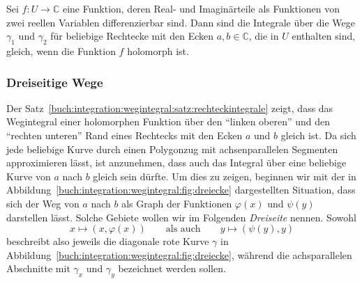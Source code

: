 \begin{satz}
\label{buch:integration:wegintegral:satz:rechteckintegrale}
Sei $f\colon U\to\mathbb{C}$ 
eine Funktion, deren Real- und Imaginärteile als Funktionen von zwei
reellen Variablen differenzierbar sind. 
Dann sind die Integrale über die Wege $\gamma_1$ und $\gamma_2$ für
beliebige Rechtecke mit den Ecken $a,b\in\mathbb{C}$, die in $U$
enthalten sind, gleich, wenn die Funktion $f$ holomorph ist.
\end{satz}

%
%
\subsubsection{Dreiseitige Wege}

Der Satz~\ref{buch:integration:wegintegral:satz:rechteckintegrale}
zeigt, dass das Wegintegral einer holomorphen Funktion über den
``linken oberen'' und den ``rechten unteren'' Rand eines Rechtecks 
mit den Ecken $a$ und $b$ gleich ist.
Da sich jede beliebige Kurve durch einen Polygonzug mit achsenparallelen
Segmenten approximieren lässt, ist anzunehmen, dass auch das Integral
über eine beliebige Kurve von $a$ nach $b$ gleich sein dürfte.
Um dies zu zeigen, beginnen wir mit der in
Abbildung~\ref{buch:integration:wegintegral:fig:dreiecke}
dargestellten Situation, dass sich der Weg von $a$ nach $b$ als Graph
der Funktionen $\varphi(x)$ und $\psi(y)$ darstellen lässt.
Solche Gebiete wollen wir im Folgenden \emph{Dreiseite} nennen.
%
Sowohl
\[
x\mapsto (x,\varphi(x))
\qquad\text{als auch}\qquad
y\mapsto (\psi(y), y)
\]
beschreibt also jeweils die diagonale rote Kurve $\gamma$ in
Abbildung~\ref{buch:integration:wegintegral:fig:dreiecke},
während die achsparallelen Abschnitte mit $\gamma_x$ und $\gamma_y$
bezeichnet werden sollen.

